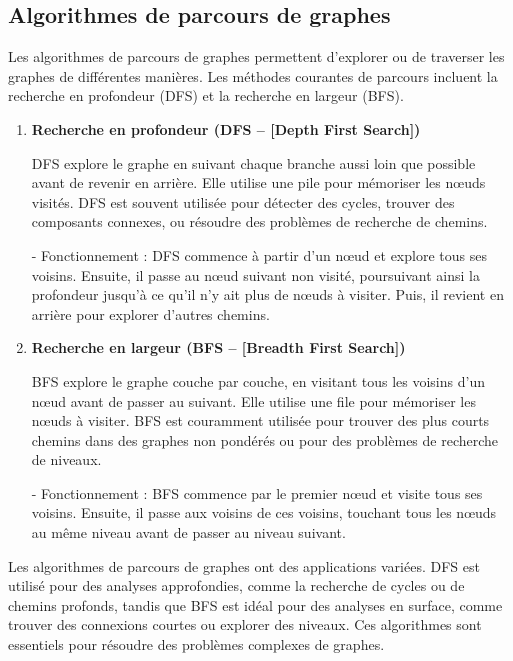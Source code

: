 \subsection{Algorithmes de parcours de graphes}

Les algorithmes de parcours de graphes permettent d'explorer ou de traverser les graphes de différentes manières. Les méthodes courantes de parcours incluent la recherche en profondeur (DFS) et la recherche en largeur (BFS).

\begin{enumerate}[label=\alph*)]
	\item \textbf{Recherche en profondeur (DFS -- [Depth First Search])}
	
	DFS explore le graphe en suivant chaque branche aussi loin que possible avant de revenir en arrière. Elle utilise une pile pour mémoriser les nœuds visités. DFS est souvent utilisée pour détecter des cycles, trouver des composants connexes, ou résoudre des problèmes de recherche de chemins.
	
	- Fonctionnement : DFS commence à partir d'un nœud et explore tous ses voisins. Ensuite, il passe au nœud suivant non visité, poursuivant ainsi la profondeur jusqu'à ce qu'il n'y ait plus de nœuds à visiter. Puis, il revient en arrière pour explorer d'autres chemins.
	
	\item \textbf{Recherche en largeur (BFS -- [Breadth First Search])}
	
	BFS explore le graphe couche par couche, en visitant tous les voisins d'un nœud avant de passer au suivant. Elle utilise une file pour mémoriser les nœuds à visiter. BFS est couramment utilisée pour trouver des plus courts chemins dans des graphes non pondérés ou pour des problèmes de recherche de niveaux.
	
	- Fonctionnement : BFS commence par le premier nœud et visite tous ses voisins. Ensuite, il passe aux voisins de ces voisins, touchant tous les nœuds au même niveau avant de passer au niveau suivant.
	
\end{enumerate}

Les algorithmes de parcours de graphes ont des applications variées. DFS est utilisé pour des analyses approfondies, comme la recherche de cycles ou de chemins profonds, tandis que BFS est idéal pour des analyses en surface, comme trouver des connexions courtes ou explorer des niveaux. Ces algorithmes sont essentiels pour résoudre des problèmes complexes de graphes.


